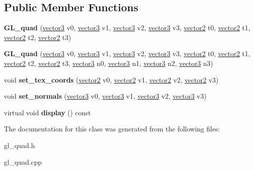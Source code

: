 \subsection*{Public Member Functions}
\begin{DoxyCompactItemize}
\item 
\hypertarget{class_g_l__quad_ad387c644e6f4f508c30727f95c6a1196}{
{\bfseries GL\_\-quad} (\hyperlink{classvector3d}{vector3} v0, \hyperlink{classvector3d}{vector3} v1, \hyperlink{classvector3d}{vector3} v2, \hyperlink{classvector3d}{vector3} v3, \hyperlink{classvector2d}{vector2} t0, \hyperlink{classvector2d}{vector2} t1, \hyperlink{classvector2d}{vector2} t2, \hyperlink{classvector2d}{vector2} t3)}
\label{class_g_l__quad_ad387c644e6f4f508c30727f95c6a1196}

\item 
\hypertarget{class_g_l__quad_aa02a88de0ee6e7a219e7ec036cb0d7ba}{
{\bfseries GL\_\-quad} (\hyperlink{classvector3d}{vector3} v0, \hyperlink{classvector3d}{vector3} v1, \hyperlink{classvector3d}{vector3} v2, \hyperlink{classvector3d}{vector3} v3, \hyperlink{classvector2d}{vector2} t0, \hyperlink{classvector2d}{vector2} t1, \hyperlink{classvector2d}{vector2} t2, \hyperlink{classvector2d}{vector2} t3, \hyperlink{classvector3d}{vector3} n0, \hyperlink{classvector3d}{vector3} n1, \hyperlink{classvector3d}{vector3} n2, \hyperlink{classvector3d}{vector3} n3)}
\label{class_g_l__quad_aa02a88de0ee6e7a219e7ec036cb0d7ba}

\item 
\hypertarget{class_g_l__quad_a2121ec966a9a822916d75403b0449edd}{
void {\bfseries set\_\-tex\_\-coords} (\hyperlink{classvector2d}{vector2} v0, \hyperlink{classvector2d}{vector2} v1, \hyperlink{classvector2d}{vector2} v2, \hyperlink{classvector2d}{vector2} v3)}
\label{class_g_l__quad_a2121ec966a9a822916d75403b0449edd}

\item 
\hypertarget{class_g_l__quad_a41a37695749725840a0b23ceec415f19}{
void {\bfseries set\_\-normals} (\hyperlink{classvector3d}{vector3} v0, \hyperlink{classvector3d}{vector3} v1, \hyperlink{classvector3d}{vector3} v2, \hyperlink{classvector3d}{vector3} v3)}
\label{class_g_l__quad_a41a37695749725840a0b23ceec415f19}

\item 
\hypertarget{class_g_l__quad_ab057aa2a55756a9bf4dffb96a12a7063}{
virtual void {\bfseries display} () const }
\label{class_g_l__quad_ab057aa2a55756a9bf4dffb96a12a7063}

\end{DoxyCompactItemize}


The documentation for this class was generated from the following files:\begin{DoxyCompactItemize}
\item 
gl\_\-quad.h\item 
gl\_\-quad.cpp\end{DoxyCompactItemize}
